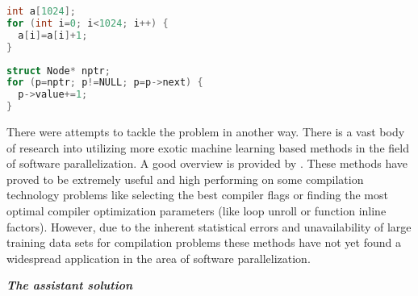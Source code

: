 \begin{description}[style=unboxed,leftmargin=0cm]
\begin{minipage}[t]{0.5\linewidth}
\begin{lstlisting}[caption={\raggedright Parallelisable loop operating on what is clear to compiler a \textbf{linear array}.},label={lst:introduction_array},language=C]
int a[1024];
for (int i=0; i<1024; i++) {
  a[i]=a[i]+1;
}
\end{lstlisting}
\end{minipage}
%
\begin{minipage}[t]{0.5\linewidth}
\begin{lstlisting}[caption={\raggedright Non-parallelisable loop operating on what programmer knows is a \textbf{linked-list}.},label={lst:introduction_list},language=C]
struct Node* nptr;
for (p=nptr; p!=NULL; p=p->next) {
  p->value+=1;
}
\end{lstlisting}
\end{minipage}
\item[\textit{Machine learning based parallelization applicability}] There were attempts to tackle the problem in another way. There is a vast body of research into utilizing more exotic machine learning based methods in the field of software parallelization. A good overview is provided by \cite{ml-oboyle}. These methods have proved to be extremely useful and high performing on some compilation technology problems like selecting the best compiler flags or finding the most optimal compiler optimization parameters (like loop unroll or function inline factors). However, due to the inherent statistical errors and unavailability of large training data sets for compilation problems these methods have not yet found a widespread application in the area of software parallelization.
\end{description}
\begin{center}
\textbf{\large \textit{The assistant solution}}
\end{center}
